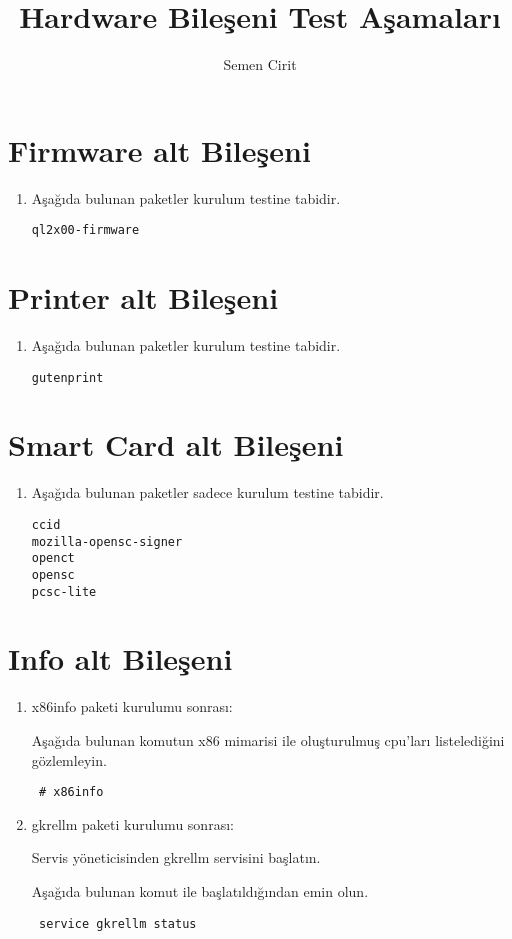 \documentclass[a4paper,10pt]{article}
\title{Hardware Bileşeni Test Aşamaları}
\author{Semen Cirit}
\begin{document}
\maketitle
\section{Firmware alt Bileşeni}
\begin{enumerate}
 \item Aşağıda bulunan paketler kurulum testine tabidir.
\begin{verbatim}
ql2x00-firmware
\end{verbatim}
\end{enumerate}

\section{Printer alt Bileşeni}
\begin{enumerate}
 \item Aşağıda bulunan paketler kurulum testine tabidir.
\begin{verbatim}
gutenprint 
\end{verbatim}


\end{enumerate}

\section{Smart Card alt Bileşeni}
\begin{enumerate}
 \item Aşağıda bulunan paketler sadece kurulum testine tabidir.
\begin{verbatim}
ccid 
mozilla-opensc-signer
openct
opensc
pcsc-lite
\end{verbatim}


\end{enumerate}

\section{Info alt Bileşeni}
\begin{enumerate}
 \item  x86info paketi kurulumu sonrası:

Aşağıda bulunan komutun x86 mimarisi ile oluşturulmuş cpu'ları listelediğini gözlemleyin.
\begin{verbatim}
 # x86info
\end{verbatim}


 \item gkrellm paketi kurulumu sonrası:

Servis yöneticisinden gkrellm servisini başlatın.

Aşağıda bulunan komut ile başlatıldığından emin olun.
\begin{verbatim}
 service gkrellm status
\end{verbatim}

\end{enumerate}
\end{document}
